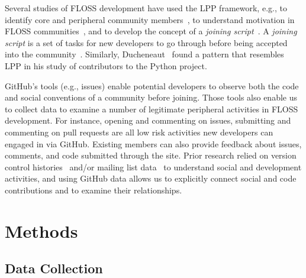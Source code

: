\documentclass{sigchi}
\begin{document}
Several studies of FLOSS development have used the LPP framework, e.g., to 
 identify core and peripheral community members~\cite{huang_mining_2005}, to understand motivation in FLOSS communities~\cite{ye_toward_2003}, and to develop the concept of a \textit{joining
script}~\cite{von_krogh_community_2003}. A \textit{joining
script} is a set of tasks for new developers to go through
before being accepted into the community~\cite{von_krogh_community_2003}.
Similarly, Ducheneaut~\cite{ducheneaut_socialization_2005} found a pattern that resembles
LPP in his study of contributors to the Python project. 

GitHub's tools (e.g., issues) enable potential developers to observe both the code and social conventions of a community before joining. Those tools also enable us to collect data to examine a number of legitimate peripheral activities in FLOSS development. For instance, opening and commenting on  issues, submitting and commenting on pull requests are all low risk activities new developers can engaged in via GitHub. Existing members can also provide feedback about issues, comments, and code submitted through the site. Prior research relied on version control histories~\cite{huang_mining_2005} and/or mailing list data~\cite{ducheneaut_socialization_2005, von_krogh_community_2003} to understand social and development activities, and using GitHub data allows us to explicitly connect social and code contributions and to examine their relationships.

\section{Methods} \label{chap:methods}

\subsection{Data Collection} \label{sec:datacollection}
\end{document}
